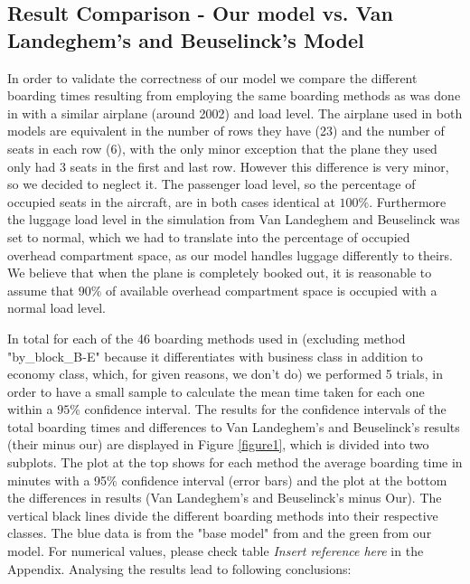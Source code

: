 \documentclass[11pt]{article}
\begin{document}
\subsection{Result Comparison - Our model vs. Van Landeghem's and Beuselinck's Model} \label{model_comp}
In order to validate the correctness of our model we compare the different boarding times resulting from employing the same boarding methods as was done in \cite{beus} with a similar airplane (around 2002) and load level. The airplane used in both models are equivalent in the number of rows they have (23) and the number of seats in each row (6), with the only minor exception that the plane they used only had 3 seats in the first and last row. However this difference is very minor, so we decided to neglect it. The passenger load level, so the percentage of occupied seats in the aircraft, are in both cases identical at $100\%$. Furthermore the luggage load level in the simulation from Van Landeghem and Beuselinck was set to normal, which we had to translate into the percentage of occupied overhead compartment space, as our model handles luggage differently to theirs. We believe that when the plane is completely booked out, it is reasonable to assume that $90\%$ of available overhead compartment space is occupied with a normal load level.

In total for each of the 46 boarding methods used in \cite{beus}(excluding method "by\_block\_B-E" because it differentiates with business class in addition to economy class, which, for given reasons, we don't do) we performed 5 trials, in order to have a small sample to calculate the mean time taken for each one within a $95\%$ confidence interval.
The results for the confidence intervals of the total boarding times and differences to Van Landeghem's and Beuselinck's results (their minus our) are displayed in Figure \ref{figure1}, which is divided into two subplots. The plot at the top shows for each method the average boarding time in minutes with a 95\% confidence interval (error bars) and the plot at the bottom the differences in results (Van Landeghem's and Beuselinck's minus Our). The vertical black lines divide the different boarding methods into their respective classes. The blue data is from the "base model" from \cite{beus} and the green from our model. For numerical values, please check table \textit{Insert reference here} in the Appendix. 
Analysing the results lead to following conclusions:
\end{document}
